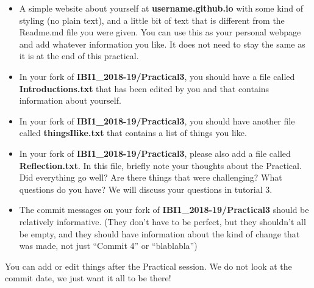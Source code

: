 \documentclass[pdflatex,a4paper]{article}
\begin{document}
\begin{itemize}
\item
A simple website about yourself at \textbf{\<username\>.github.io} with some kind of styling (no plain text), and a little bit of text that is different from the Readme.md file you were given. You can use this as your personal webpage and add whatever information you like. It does not need to stay the same as it is at the end of this practical.
\item
In your fork of \textbf{IBI1\_2018-19/Practical3}, you should have a file called \textbf{Introductions.txt} that has been edited by you and that contains information about yourself.
\item
In your fork of \textbf{IBI1\_2018-19/Practical3}, you should have another file called \textbf{thingsIlike.txt} that contains a list of things you like.
\item
In your fork of \textbf{IBI1\_2018-19/Practical3}, please also add a file called \textbf{Reflection.txt}. In this file, briefly note your thoughts about the Practical. Did everything go well? Are there things that were challenging? What questions do you have? We will discuss your questions in tutorial 3. 
\item
The commit messages on your fork of \textbf{IBI1\_2018-19/Practical3} should be relatively informative. (They don't have to be perfect, but they shouldn't all be empty, and they should have information about the kind of change that was made, not just ``Commit 4'' or ``blablabla'')
\end{itemize}

You can add or edit things after the Practical session. We do not look at the commit date, we just want it all to be there!
\end{document}

